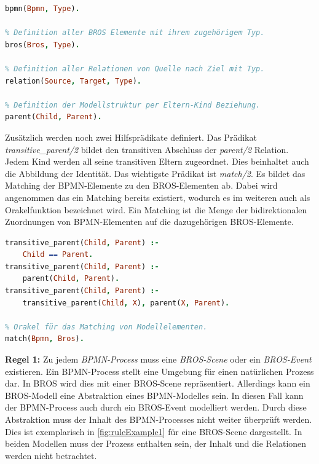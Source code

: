 \begin{lstlisting}[language=Prolog, caption=Definitionen der Faktenbasis, label=lst:definition_facts]
% Definition aller BPMN Elemente mit ihrem zugehörigem Typ.
bpmn(Bpmn, Type).

% Definition aller BROS Elemente mit ihrem zugehörigem Typ.
bros(Bros, Type).

% Definition aller Relationen von Quelle nach Ziel mit Typ.
relation(Source, Target, Type).

% Definition der Modellstruktur per Eltern-Kind Beziehung.
parent(Child, Parent).
\end{lstlisting}

Zusätzlich werden noch zwei Hilfsprädikate definiert.
Das Prädikat \emph{transitive\_parent/2} bildet den transitiven Abschluss der \emph{parent/2} Relation.
Jedem Kind werden all seine transitiven Eltern zugeordnet.
Dies beinhaltet auch die Abbildung der Identität.
Das wichtigste Prädikat ist \emph{match/2}.
Es bildet das Matching der BPMN-Elemente zu den BROS-Elementen ab.
Dabei wird angenommen das ein Matching bereits existiert, wodurch es im weiteren auch als Orakelfunktion bezeichnet wird.
Ein Matching ist die Menge der bidirektionalen Zuordnungen von BPMN-Elementen auf die dazugehörigen BROS-Elemente. 

\begin{lstlisting}[language=Prolog, caption=Definitionen der weiterführenden Regeln, label=lst:definition_predicats]
% Transitiver Abschluss der Modellstruktur.
transitive_parent(Child, Parent) :- 
    Child == Parent.
transitive_parent(Child, Parent) :- 
    parent(Child, Parent).
transitive_parent(Child, Parent) :- 
    transitive_parent(Child, X), parent(X, Parent).

% Orakel für das Matching von Modellelementen.
match(Bpmn, Bros).
\end{lstlisting}

\textbf{Regel 1:} 
Zu jedem \emph{BPMN-Process} muss eine \emph{BROS-Scene} oder ein \emph{BROS-Event} existieren.
Ein BPMN-Process stellt eine Umgebung für einen natürlichen Prozess dar.
In BROS wird dies mit einer BROS-Scene repräsentiert.
Allerdings kann ein BROS-Modell eine Abstraktion eines BPMN-Modelles sein.
In diesen Fall kann der BPMN-Process auch durch ein BROS-Event modelliert werden.
Durch diese Abstraktion muss der Inhalt des BPMN-Processes nicht weiter überprüft werden.
Dies ist exemplarisch in \cref{fig:ruleExample1} für eine BROS-Scene dargestellt.
In beiden Modellen muss der Prozess enthalten sein, der Inhalt und die Relationen werden nicht betrachtet.

